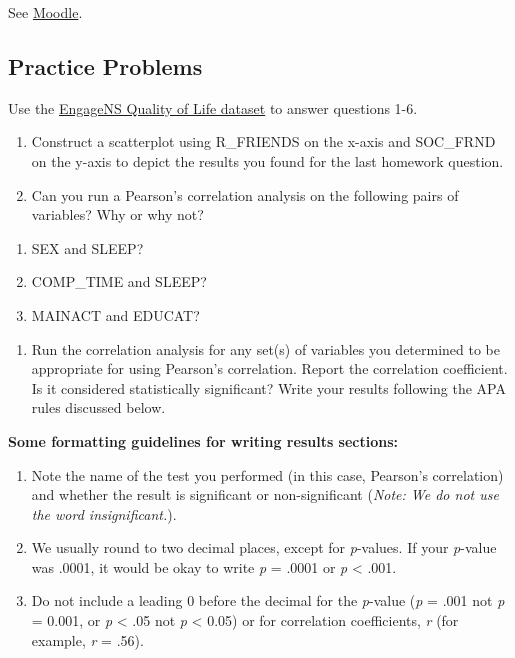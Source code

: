 \documentclass[
]{book}
\providecommand{\tightlist}{%
  \setlength{\itemsep}{0pt}\setlength{\parskip}{0pt}}
\begin{document}
See \href{https://moodle.stfx.ca/course/view.php?id=26030\#section-13}{Moodle}.

\hypertarget{practice-problems-3}{%
\subsection{Practice Problems}\label{practice-problems-3}}

Use the \href{https://moodle.stfx.ca/mod/url/view.php?id=830017}{EngageNS Quality of Life dataset} to answer questions 1-6.

\begin{enumerate}
\def\labelenumi{\arabic{enumi}.}
\item
  Construct a scatterplot using R\_FRIENDS on the x-axis and SOC\_FRND on the y-axis to depict the results you found for the last homework question.
\item
  Can you run a Pearson's correlation analysis on the following pairs of variables? Why or why not?
\end{enumerate}

\begin{enumerate}
\def\labelenumi{\alph{enumi})}
\tightlist
\item
  SEX and SLEEP?
\item
  COMP\_TIME and SLEEP?
\item
  MAINACT and EDUCAT?
\end{enumerate}

\begin{enumerate}
\def\labelenumi{\arabic{enumi}.}
\setcounter{enumi}{2}
\tightlist
\item
  Run the correlation analysis for any set(s) of variables you determined to be appropriate for using Pearson's correlation. Report the correlation coefficient. Is it considered statistically significant? Write your results following the APA rules discussed below.
\end{enumerate}

\textbf{Some formatting guidelines for writing results sections:}

\begin{enumerate}
\def\labelenumi{\alph{enumi}.}
\item
  Note the name of the test you performed (in this case, Pearson's correlation) and whether the result is significant or non-significant (\emph{Note: We do not use the word insignificant.}).
\item
  We usually round to two decimal places, except for \emph{p}-values. If your \emph{p}-value was .0001, it would be okay to write \emph{p} = .0001 or \emph{p} \textless{} .001.
\item
  Do not include a leading 0 before the decimal for the \emph{p}-value (\emph{p} = .001 not \emph{p} = 0.001, or \emph{p} \textless{} .05 not \emph{p} \textless{} 0.05) or for correlation coefficients, \emph{r} (for example, \emph{r} = .56).
\end{enumerate}
\end{document}
